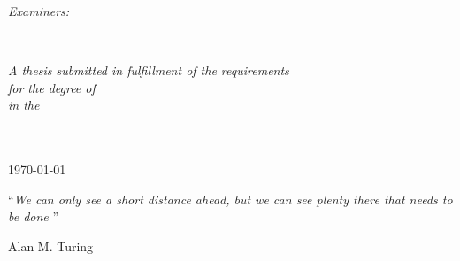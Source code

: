 \documentclass[
    11pt,
    oneside, %
    english,
    onehalfspacing, %
    parskip, %
]{PhDDoctoralThesis}
\begin{document}
\begin{titlepage}
\begin{center}
\begin{minipage}[t]{0.4\textwidth}
                \begin{flushright}
                    \large
                    \emph{Examiners:}\\
                    \examname
                \end{flushright}
            \end{minipage}\\[3cm]
            \vfill

            \large \textit{A thesis submitted in fulfillment of the requirements\\ for the degree of \degreename}\\[0.3cm] %
            \textit{in the}\\[0.4cm]
            \facname \\ \deptname\\[2cm]

            \vfill

            {\large \today}\\[4cm] %

            \vfill
        \end{center}
    \end{titlepage}


    \vspace*{0.2\textheight}

    \noindent\enquote{\itshape We can only see a short distance ahead, but we can see plenty there that needs to be done }\bigbreak

    \hfill Alan M. Turing


\end{document}
